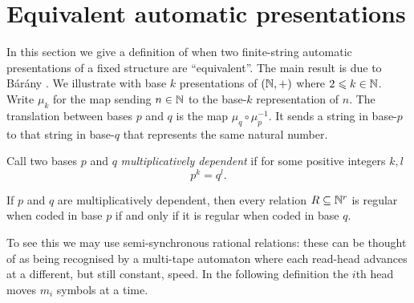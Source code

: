 


\section{Equivalent automatic presentations} \label{AS:sec:equiv}

In this section we give a definition of when two finite-string automatic presentations of a fixed structure are ``equivalent''. 
The main result is due to B{\'a}r{\'a}ny \cite{Bara06}. We illustrate with base $k$ presentations of
$(\mathbb{N},+)$ where $2 \leqslant k \in \mathbb{N}$. Write $\mu_k$ for the map sending $n \in \mathbb{N}$ to the base-$k$ representation of $n$.
The translation between bases $p$ and $q$ is the map $\mu_q \circ \mu_p^{-1}$. It sends a string in base-$p$ to that
string in base-$q$ that represents the same natural number.

Call two bases $p$ and $q$ {\em multiplicatively dependent} if for some positive integers
$k,l$
\[
 p^k = q^l.
\]


\begin{proposition} \label{AS:prop:multdep}
If $p$ and $q$ are multiplicatively dependent, then every relation $R \subseteq \mathbb{N}^r$
is regular when coded in base $p$ if and only if it is regular when coded in base $q$.
\end{proposition}

To see this we may use semi-synchronous rational relations: these can be thought of as being
recognised by a multi-tape automaton where each read-head advances at a
different, but still constant, speed. In the following definition the $i$th head moves $m_i$ symbols at a time.

